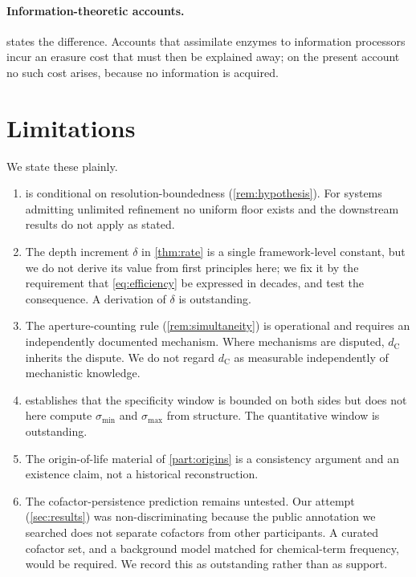 \documentclass[11pt,twocolumn,a4paper]{article}
\theoremstyle{plain}
\theoremstyle{definition}
\theoremstyle{remark}
\newcommand{\dC}{d_{\mathrm{C}}}
\begin{document}
\paragraph{Information-theoretic accounts.}  states
the difference. Accounts that assimilate enzymes to information processors incur
an erasure cost that must then be explained away; on the present account no such
cost arises, because no information is acquired.

\section{Limitations}
\label{sec:limitations}

We state these plainly.

\begin{enumerate}[leftmargin=2em,itemsep=0.4em]
\item {} is conditional on resolution-boundedness
(\cref{rem:hypothesis}). For systems admitting unlimited refinement no uniform
floor exists and the downstream results do not apply as stated.
\item The depth increment $\delta$ in \cref{thm:rate} is a single
framework-level constant, but we do not derive its value from first principles
here; we fix it by the requirement that \cref{eq:efficiency} be expressed in
decades, and test the consequence. A derivation of $\delta$ is outstanding.
\item The aperture-counting rule (\cref{rem:simultaneity}) is operational and
requires an independently documented mechanism. Where mechanisms are disputed,
$\dC$ inherits the dispute. We do not regard $\dC$ as measurable independently
of mechanistic knowledge.
\item {} establishes that the specificity window is bounded on
both sides but does not here compute $\sigma_{\min}$ and $\sigma_{\max}$ from
structure. The quantitative window is outstanding.
\item The origin-of-life material of \cref{part:origins} is a consistency
argument and an existence claim, not a historical reconstruction.
\item The cofactor-persistence prediction remains untested. Our attempt
(\cref{sec:results}) was non-discriminating because the public annotation we
searched does not separate cofactors from other participants. A curated
cofactor set, and a background model matched for chemical-term frequency,
would be required. We record this as outstanding rather than as support.
\end{enumerate}
\end{document}
